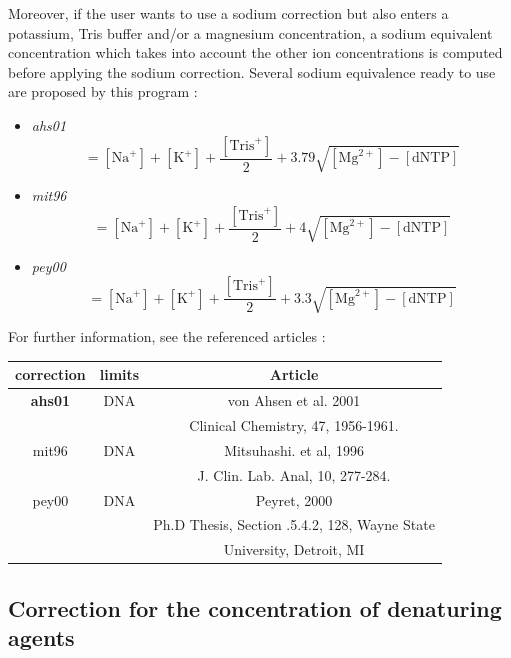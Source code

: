 \documentclass{article}
\begin{document}
Moreover, if the user wants to use a sodium correction but also enters a potassium, Tris buffer
and/or a magnesium concentration, a sodium equivalent concentration which takes into account the other
ion concentrations is computed before applying the sodium correction.
Several sodium equivalence ready to use are proposed by this program :
\begin{itemize}
\item \textit{ahs01}
 \begin{displaymath}
 [\mbox{NaEq}^+]=[\mbox{Na}^+]+[\mbox{K}^+]+\frac{[\mbox{Tris}^+]}{2}+3.79 \sqrt{[\mbox{Mg}^{2+}] - [\mbox{dNTP}]}
 \end{displaymath}
 \item \textit{mit96}
 \begin{displaymath}
 [\mbox{NaEq}^+]=[\mbox{Na}^+]+[\mbox{K}^+]+\frac{[\mbox{Tris}^+]}{2}+4 \sqrt{[\mbox{Mg}^{2+}] - [\mbox{dNTP}]}
 \end{displaymath}
 \item \textit{pey00}
 \begin{displaymath}
 [\mbox{NaEq}^+]=[\mbox{Na}^+]+[\mbox{K}^+]+\frac{[\mbox{Tris}^+]}{2}+3.3 \sqrt{[\mbox{Mg}^{2+}] - [\mbox{dNTP}]}
 \end{displaymath}
\end{itemize}

For further information, see the referenced articles :
\begin{table}[hc]
\begin{tabular}[h]{| c | c | c |}
\textbf{correction} & \textbf{limits} & \textbf{Article} \\
\hline 
\textbf{ahs01} & DNA & von Ahsen et al. 2001 \\
 & & Clinical Chemistry, 47, 1956-1961. \\
\hline
mit96 & DNA & Mitsuhashi. et al, 1996 \\
 & & J. Clin. Lab. Anal, 10, 277-284.\\
\hline
pey00 & DNA & Peyret, 2000 \\
 & & Ph.D Thesis, Section .5.4.2, 128, Wayne State \\
 & & University, Detroit, MI\\
 \hline
\end{tabular}
\end{table}

\subsection{Correction for the concentration of denaturing agents}  
\end{document}
